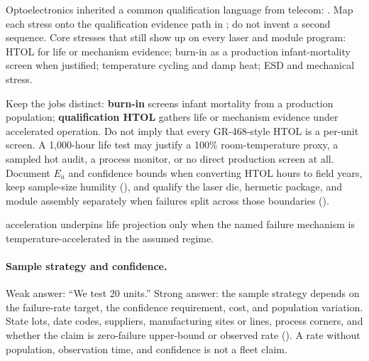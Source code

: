 Optoelectronics inherited a common qualification language from telecom:
. Map each stress onto the
qualification evidence path in ; do not invent a
second sequence. Core stresses that still show up on every laser and module
program: HTOL for life or mechanism evidence; burn-in as a production
infant-mortality screen when justified; temperature cycling and damp heat; ESD
and mechanical stress.

Keep the jobs distinct: \textbf{burn-in} screens infant mortality from a
production population; \textbf{qualification HTOL} gathers life or mechanism
evidence under accelerated operation. Do not imply that every GR-468-style HTOL
is a per-unit screen. A 1{,}000-hour life test may justify a 100\%
room-temperature proxy, a sampled hot audit, a process monitor, or no direct
production screen at all. Document $E_a$ and confidence bounds when converting
HTOL hours to field years, keep sample-size humility
(), and qualify the laser die, hermetic package, and
module assembly separately when failures split across those boundaries
().

 acceleration underpins life projection only when the named
failure mechanism is temperature-accelerated in the assumed regime.

\paragraph{Sample strategy and confidence.}
\label{sec:qual-sample-strategy}

Weak answer: ``We test 20 units.'' Strong answer: the sample strategy depends
on the failure-rate target, the confidence requirement, cost, and population
variation. State lots, date codes, suppliers, manufacturing sites or lines,
process corners, and whether the claim is zero-failure upper-bound or observed
rate (). A rate without population,
observation time, and confidence is not a fleet claim.



